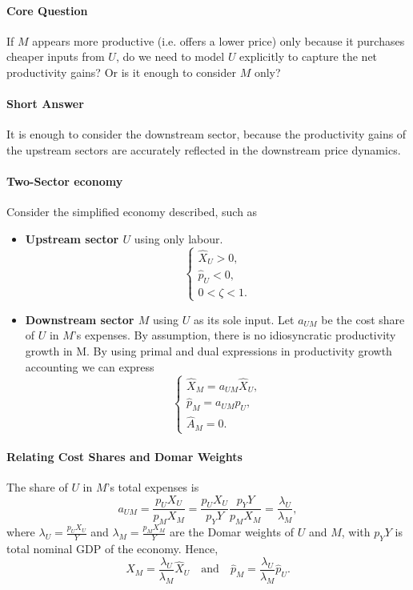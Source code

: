 \documentclass[11pt]{article}
\begin{document}
\paragraph{Core Question} If $M$ appears more productive (i.e. offers a lower price) only because it purchases cheaper inputs from $U$, do we need to model $U$ explicitly to capture the net productivity gains? Or is it enough to consider $M$ only?

\paragraph{Short Answer} 
It is enough to consider the downstream sector, because the productivity gains of the upstream sectors are accurately reflected in the downstream price dynamics. 

\paragraph{Two-Sector economy} Consider the simplified economy described, such as
\begin{itemize}
    \item \textbf{Upstream sector $U$} using only labour. 
    \[
    \begin{cases}
    \hat{X}_U > 0,\\
    \hat{p}_U < 0,\\
    0 < \zeta < 1.
    \end{cases}
    \]
    \item \textbf{Downstream sector $M$} using $U$ as its sole input. Let $a_{UM}$ be the cost share of $U$ in $M$'s expenses. By assumption, there is no idiosyncratic productivity growth in M. By using primal and dual expressions in productivity growth accounting we can express
    \[
    \begin{cases}
    \hat{X}_M = a_{UM}  \hat{X}_U,\\
    \hat{p}_M = a_{UM}  \hat{p}_U,\\
    \hat{A}_M = 0.
    \end{cases}
    \]
\end{itemize}

\paragraph{Relating Cost Shares and Domar Weights}
The share of $U$ in $M$'s total expenses is
\begin{equation*}
     a_{UM}  =  \frac{p_U X_U}{p_M X_M}  =  \frac{p_U X_U}{p_Y Y} \frac{p_Y Y}{p_M X_M} 
     =  \frac{\lambda_U}{\lambda_M},
\end{equation*}
where $\lambda_U = \tfrac{p_U X_U}{Y}$ and $\lambda_M = \tfrac{p_M X_M}{Y}$ are the Domar weights of $U$ and $M$, with $p_Y Y$ is total nominal GDP of the economy. Hence, 
\begin{equation*}
    \hat{X}_M = \frac{\lambda_U}{\lambda_M} \hat{X}_U
    \quad\text{and}\quad
    \hat{p}_M = \frac{\lambda_U}{\lambda_M} \hat{p}_U.
\end{equation*}
\end{document}
